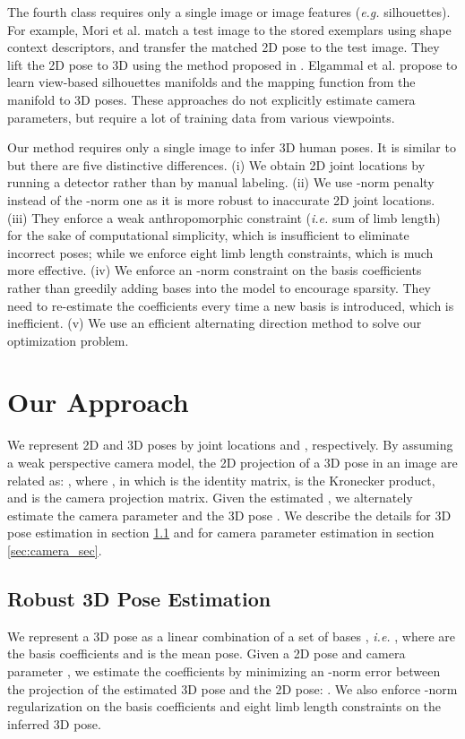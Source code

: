 \documentclass[10pt,twocolumn,letterpaper]{article}
\begin{document}
The fourth class \cite{mori2006recovering} \cite{elgammal2004inferring} requires only a single image or image features ({\it e.g.} silhouettes). For example, Mori et al. \cite{mori2006recovering} match a test image to the stored exemplars using shape context descriptors, and transfer the matched 2D pose to the test image. They lift the 2D pose to 3D using the method proposed in \cite{Taylor}. Elgammal et al.\cite{elgammal2004inferring} propose to learn view-based silhouettes manifolds and the mapping function from the manifold to 3D poses. These approaches do not explicitly estimate camera parameters, but require a lot of training data from various viewpoints.

Our method requires only a single image to infer 3D human poses. It is similar to \cite{Ramakrishna}
but there are five distinctive differences. (i) We obtain 2D
joint locations by running a detector \cite{Yang2D} rather
than by manual labeling. (ii) We use -norm penalty instead
of the -norm one as it is more robust to inaccurate 2D joint locations. (iii) They \cite{Ramakrishna} enforce a weak anthropomorphic constraint
({\em i.e.} sum of limb length) for the sake of computational
simplicity, which is insufficient to eliminate incorrect poses;
while we enforce eight limb length constraints, which is much more
effective. (iv) We enforce an
-norm constraint on the basis coefficients rather than
greedily adding bases into the model to encourage sparsity. They
need to re-estimate the coefficients every time a new
basis is introduced, which is inefficient. (v) We use an efficient
alternating direction method to solve our optimization problem.



\section{Our Approach}
\label{sec:approach} We represent 2D and 3D poses by  joint
locations  and ,
respectively. By assuming a weak perspective camera model, the 2D projection  of a 3D
pose  in an image are related as: , where , in which  is the identity matrix,  is
the
Kronecker product, and  is the camera projection matrix.
Given the estimated , we alternately estimate the camera parameter
 and the 3D pose . We describe the details for 3D pose estimation in section \ref{sec:3d_pose_sec} and for camera parameter
estimation in section \ref{sec:camera_sec}.

\subsection{Robust 3D Pose Estimation}
\label{sec:3d_pose_sec} We represent a 3D pose  as a linear
combination of a set of bases , {\em i.e.}
, where  are
the basis coefficients and  is the mean pose. Given a 2D pose
 and camera parameter , we estimate the coefficients
 by minimizing an -norm error between the projection of
the estimated 3D pose and the 2D pose: . We also enforce -norm
regularization on the basis coefficients  and eight limb
length constraints on the inferred 3D pose.
\end{document}
